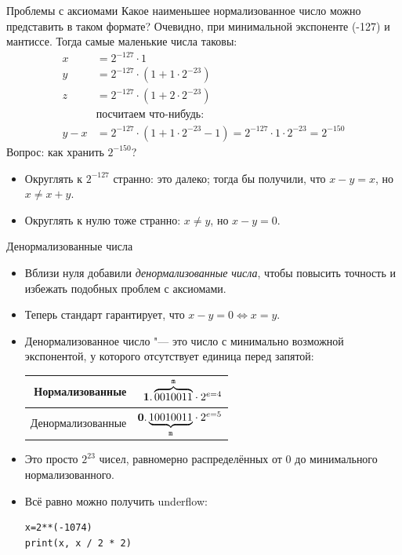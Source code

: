 \begin{frame}{Проблемы с аксиомами}
	Какое наименьшее нормализованное число можно представить в таком формате?
	Очевидно, при минимальной экспоненте (-127) и мантиссе.
	Тогда самые маленькие числа таковы:
	\begin{align*}
		x &= 2^{-127} \cdot 1 \\
		y &= 2^{-127} \cdot (1 + 1 \cdot 2^{-23}) \\
		z &= 2^{-127} \cdot (1 + 2 \cdot 2^{-23}) \\
		& \text{посчитаем что-нибудь:} \\
		y - x &= 2^{-127} \cdot (1 + 1 \cdot 2^{-23} - 1) = 2^{-127} \cdot 1 \cdot 2^{-23} = 2^{-150}
	\end{align*}
	Вопрос: как хранить $2^{-150}$?
	\begin{itemize}
		\item
			Округлять к $2^{-127}$ странно: это далеко; тогда бы получили, что $x-y=x$, но $x\neq x + y$.
		\item
			Округлять к нулю тоже странно: $x \neq y$, но $x - y = 0$.
	\end{itemize}
\end{frame}

\begin{frame}[fragile]{Денормализованные числа}
	\begin{itemize}
		\item 
			Вблизи нуля добавили \textit{денормализованные числа}, чтобы повысить точность и избежать подобных проблем с аксиомами.
		\item
			Теперь стандарт гарантирует, что $x - y = 0 \iff x = y$.
		\item
			Денормализованное число "--- это число с минимально возможной экспонентой, у которого отсутствует единица перед запятой:
			\begin{center}
				\begin{tabular}{r|r}
					Нормализованные   & $\t{\textbf{1}.\overbrace {0010011}^{m}} \cdot 2^{e=4}$ \\\hline
					Денормализованные & $\t{\textbf{0}.\underbrace{10010011}_{m}} \cdot 2^{e=5}$ \\
				\end{tabular}
			\end{center}
		\item
			Это просто $2^{23}$ чисел, равномерно распределённых от 0 до минимального нормализованного.
		\item
			Всё равно можно получить underflow:
\begin{verbatim}
x=2**(-1074)
print(x, x / 2 * 2)
\end{verbatim}
	\end{itemize}
\end{frame}

